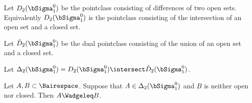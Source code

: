 \documentclass[oneside,12pt]{amsart}
\begin{document}
\begin{definition}
Let $D_2(\bSigma^0_1)$ be the pointclass consisting of differences of two open sets. Equivalently $D_2(\bSigma^0_1)$
is the pointclass consisting of the intersection of an open set and a closed set.

Let $\hat{D}_2(\bSigma^0_1)$ be the dual pointclass consisting of the union of an open set and a closed set.

Let $\Delta_2(\bSigma^0_1) = D_2(\bSigma^0_1) \intersect \hat{D}_2(\bSigma^0_1)$.
\end{definition}

\begin{theorem} Let $A,B\subset\Bairespace$. Suppose that $A\in \Delta_2(\bSigma^0_1)$ and $B$ is neither open nor closed.
Then $A \Wadgeleq B$.
\end{theorem}
\end{document}
